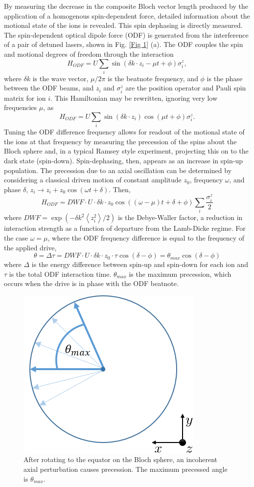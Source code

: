 \documentclass[aps,prl,twocolumn,groupedaddress,floatfix]{revtex4-1}
\begin{document}
By measuring the decrease in the composite Bloch vector length produced by the application of a homogenous spin-dependent force, detailed information about the motional state of the ions is revealed. This spin dephasing is directly measured. The spin-dependent optical dipole force (ODF) is generated from the interference of a pair of detuned lasers, shown in Fig. \ref{Fig 1} (a). The ODF couples the spin and motional degrees of freedom through the interaction 
\begin{equation}
H_{ODF} = U\sum_{i}\sin(\delta k \cdot z_{i} - \mu t + \phi)\sigma^{z}_{i} ,
\end{equation}
where $\delta k$ is the wave vector, $\mu/2\pi$ is the beatnote frequency, and $\phi$ is the phase between the ODF beams, and $z_i$ and $\sigma^{z}_i$ are the position operator and Pauli spin matrix for ion $i$. This Hamiltonian may be rewritten, ignoring very low frequencies $\mu$, as
\[H_{ODF} = U\sum_{i}\sin(\delta k \cdot z_i)\cos(\mu t + \phi)\sigma^{z}_i. \]
Tuning the ODF difference frequency allows for readout of the motional state of the ions at that frequency by measuring the precession of the spins about the Bloch sphere and, in a typical Ramsey style experiment, projecting this on to the dark state (spin-down). Spin-dephasing, then, appears as an increase in spin-up population. The precession due to an axial oscillation can be determined by considering a classical driven motion of constant amplitude $z_{0}$, frequency $\omega$, and phase $\delta$, $z_i \rightarrow z_i +z_0\cos(\omega t+\delta)$.
Then,
\[H_{ODF} = DWF \cdot U \cdot \delta k \cdot z_0\cos((\omega - \mu)t + \delta + \phi) \sum_{i} \frac{\sigma^{z}_{i}}{2} \]
where $DWF = \exp(-\delta k^2 \left< z^{2}_{i} \right> / 2) $ is the Debye-Waller factor, a reduction in interaction strength as a function of departure from the Lamb-Dicke regime.
For the case $ \omega = \mu $, where the ODF frequency difference is equal to the frequency of the applied drive,
\[\theta = \Delta\tau = DWF \cdot U \cdot \delta k \cdot z_0 \cdot \tau \cos(\delta - \phi) = \theta_{max}\cos(\delta - \phi)\]
where $\Delta$ is the energy difference between spin-up and spin-down for each ion and $\tau$ is the total ODF interaction time. $\theta_{max}$ is the maximum precession, which occurs when the drive is in phase with the ODF beatnote.
\begin{figure}[h]
\includegraphics[width=.15\textwidth]{dephasing}
\caption{After rotating to the equator on the Bloch sphere, an incoherent axial perturbation causes precession. The maximum precessed angle is $\theta_{max}$.}\label{Fig 2}
\end{figure}
\end{document}
